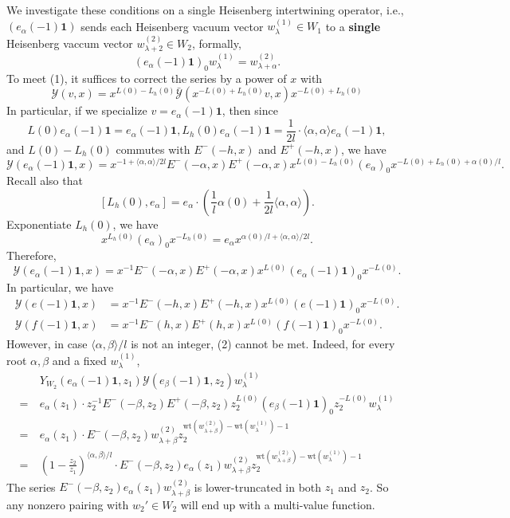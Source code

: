 \documentclass[11pt,oneside,reqno]{amsart}
\theoremstyle{definition}
\newcommand{\Y}{{\mathcal Y}}
\newcommand{\one}{\mathbf{1}}
\begin{document}
We investigate these conditions on a single Heisenberg intertwining operator, i.e., $(e_\alpha(-1)\one)$ sends each Heisenberg vacuum vector  $w_\lambda^{(1)} \in W_1$ to a \textbf{single} Heisenberg vaccum vector $w_{\lambda+2}^{(2)}\in W_2$, formally, 
$$(e_\alpha(-1)\one)_0 w_\lambda^{(1)} = w_{\lambda+\alpha}^{(2)}.$$
To meet (1), it suffices to correct the series by a power of $x$ with
$$\Y(v, x) = x^{L(0)-L_h(0)} \bar\Y(x^{-L(0)+L_h(0)}v, x)x^{-L(0)+L_h(0)}$$
In particular, if we specialize $v=e_\alpha(-1)\one$, then since $$L(0)e_\alpha(-1)\one = e_\alpha(-1)\one, L_h(0)e_\alpha(-1)\one = \frac 1 {2l}\cdot \langle \alpha, \alpha\rangle e_\alpha(-1)\one, $$
and $L(0)-L_h(0)$ commutes with $E^-(-h, x)$ and $E^+(-h,x)$, we have
$$\Y(e_\alpha(-1)\one, x) = x^{-1+\langle\alpha,\alpha\rangle/2l} E^-(-\alpha,x)E^+(-\alpha,x)x^{L(0)-L_h(0)}(e_\alpha)_0 x^{-L(0)+L_h(0)+\alpha(0)/l}. $$
Recall also that 
$$[L_h(0), e_\alpha]=e_\alpha \cdot \left(\frac 1 l \alpha(0)+\frac 1 {2l} \langle \alpha, \alpha\rangle \right).$$
Exponentiate $L_h(0)$, we have
$$x^{L_h(0)}(e_\alpha)_0 x^{-L_h(0)} = e_\alpha x^{\alpha(0)/l + \langle \alpha, \alpha\rangle / 2l}.$$
Therefore, 
$$\Y(e_\alpha(-1)\one, x) = x^{-1} E^-(-\alpha,x)E^+(-\alpha,x)x^{L(0)}(e_\alpha(-1)\one)_0 x^{-L(0)}. $$
In particular, we have
\begin{align*}
    \Y(e(-1)\one, x) &= x^{-1} E^-(-h,x)E^+(-h,x)x^{L(0)}(e(-1)\one)_0 x^{-L(0)}. \\
    \Y(f(-1)\one, x) & = x^{-1} E^-(h,x)E^+(h,x)x^{L(0)}(f(-1)\one)_0 x^{-L(0)}. 
\end{align*}
However, in case $\langle \alpha, \beta\rangle/l$ is not an integer, (2) cannot be met. Indeed, for every root $\alpha, \beta$ and a fixed $w_{\lambda}^{(1)}$,
\begin{align*}
    & Y_{W_2}(e_\alpha(-1)\one, z_1) \Y(e_\beta(-1)\one, z_2)w_\lambda^{(1)} \\
    = \ & e_\alpha(z_1) \cdot z_2^{-1} E^-(-\beta, z_2) E^+(-\beta, z_2) z_2^{L(0)}(e_\beta(-1)\one)_0 z_2^{-L(0)} w_\lambda^{(1)}\\
    = \ & e_\alpha(z_1) \cdot E^-(-\beta, z_2) w_{\lambda+\beta}^{(2)} z_2^{\text{wt}(w_{\lambda+\beta}^{(2)}) - \text{wt}(w_\lambda^{(1)})-1} \\
    = \ &  \left(1-\frac {z_2}{z_1}\right)^{\langle\alpha, \beta\rangle / l}\cdot E^-(-\beta, z_2) e_\alpha(z_1)w_{\lambda+\beta}^{(2)} z_2^{\text{wt}(w_{\lambda+\beta}^{(2)}) - \text{wt}(w_\lambda^{(1)})-1} 
\end{align*}
The series $E^-(-\beta, z_2) e_\alpha(z_1)w_{\lambda+\beta}^{(2)}$ is lower-truncated in both $z_1$ and $z_2$. So any nonzero pairing with $w_2' \in W_2$ will end up with a multi-value function. 
\end{document}

